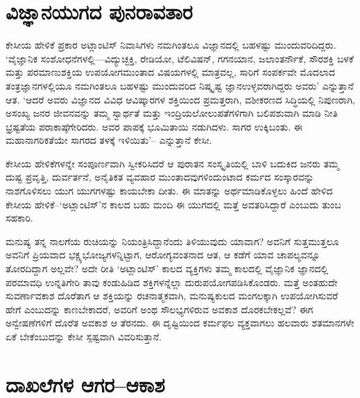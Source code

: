 \section*{ವಿಜ್ಞಾನಯುಗದ ಪುನರಾವತಾರ}


ಕೇಸೀಯ ಹೇಳಿಕೆ ಪ್ರಕಾರ ಅಟ್ಲಾಂಟಿಸ್ ನಿವಾಸಿಗಳು ನಮಗಿಂತಲೂ ವಿಜ್ಞಾನದಲ್ಲಿ ಬಹಳಷ್ಟು ಮುಂದುವರಿದಿದ್ದರು. ‘ವೈಜ್ಞಾನಿಕ ಸಂಶೋಧನೆಗಳಲ್ಲಿ—ವಿದ್ಯುಚ್ಛಕ್ತಿ, ರೇಡಿಯೋ, ಟೆಲಿವಿಷನ್, ಗಗನಯಾನ, ಜಲಾಂತರ್ನೌಕೆ, ಸೌರಶಕ್ತಿ ಬಳಕೆ ಮತ್ತು ಪರಮಾಣುಶಕ್ತಿಯ ಉಪಯೋಗ\break ಮುಂತಾದ ವಿಷಯಗಳಲ್ಲಿ ಮಾತ್ರವಲ್ಲ, ಸಾರಿಗೆ ಸಂಪರ್ಕವೇ ಮೊದಲಾದ ತಂತ್ರಜ್ಞಾನಗಳಲ್ಲಿಯೂ ನಮಗಿಂತಲೂ ಬಹಳಷ್ಟು ಮುಂದುವರಿದ ನಿಷ್ಕೃಷ್ಟ ಜ್ಞಾನಉಳ್ಳವರಾಗಿದ್ದರು ಅವರು’ ಎನ್ನುತ್ತಾನೆ ಆತ. ‘ಆದರೆ ಅವರು ವಿಜ್ಞಾನದ ವಿವಿಧ ಆವಿಷ್ಕಾರಗಳ ಶಕ್ತಿಯಿಂದ ಪ್ರಮತ್ತರಾಗಿ, ವಶೀಕರಣದ ಸಿದ್ಧಿಯಲ್ಲಿ ನಿಪುಣರಾಗಿ, ಅಸಂಖ್ಯ ಜನರ ಜೀವನವನ್ನು ತಮ್ಮ ಸ್ವಾರ್ಥತೆ ಮತ್ತು ಇಂದ್ರಿಯಲೋಲುಪತೆಗಳಿಗಾಗಿ ಬಲಿಪಶುವಾಗಿ ಮಾಡಿ ನೀತಿ ಭ್ರಷ್ಟತೆಯ ಪರಾಕಾಷ್ಠೆಗೇರಿದರು. ಅವರ ಪಾಪಕ್ಕೆ ಭೂಮಿತಾಯಿ ನಡುಗಿದಳು. ಸಾಗರ ಉಕ್ಕಿಬಂತು. ಈ ಮಹಾನಾಗರಿಕತೆಯೇ ಸಾಗರದ ತಳಕ್ಕೆ ಇಳಿಯಿತು’– ಎನ್ನುತ್ತಾನೆ ಕೇಸೀ.

ಕೇಸೀಯ ಹೇಳಿಕೆಗಳನ್ನೇ ಸಂಪೂರ್ಣವಾಗಿ ಸ್ವೀಕರಿಸಿದರೆ ಆ ಪುರಾತನ ಸಂಸ್ಕೃತಿಯಲ್ಲಿ ಬಾಳಿ ಬದುಕಿದ ಜನರು ತಮ್ಮ ದುಷ್ಟ ಪ್ರವೃತ್ತಿ, ದುರ್ವರ್ತನೆ, ಅನೈತಿಕತ ವ್ಯವಹಾರ ಮುಂತಾದವು\-ಗಳಿಂದುಂಟಾದ ಕರ್ಮದ ಸಂಸ್ಕಾರವನ್ನು ನಾಶಗೊಳಿಸಲು ಯುಗ ಯುಗಗಳಷ್ಟು ಕಾಯಬೇಕಾ ದೀತು. ಈ ಮಾತನ್ನು ಅರ್ಥಮಾಡಿಕೊಳ್ಳಲು ಹಿಂದೆ ಹೇಳಿದ ಕೇಸೀಯ ಹೇಳಿಕೆ–‘ಅಟ್ಲಾಂಟಿಸ್​’ನ ಕಾಲದ ಬಹು ಮಂದಿ ಈ ಯುಗದಲ್ಲಿ ಮತ್ತೆ ಅವತರಿಸಿದ್ದಾರೆ ಎಂಬುದು ತುಂಬ ಸಹಕಾರಿ.

ಮನುಷ್ಯ ತನ್ನ ನಾಲಗೆಯ ರುಚಿಯನ್ನು ನಿಯಂತ್ರಿಸಿದ್ದಾನೆಂದು ತಿಳಿಯುವುದು ಯಾವಾಗ? ಅವನಿಗೆ ಸುತ್ತಮುತ್ತಲೂ ಅವನಿಗೆ ಪ್ರಿಯವಾದ ಭಕ್ಷ್ಯಭೋಜ್ಯಗಳನ್ನಿಟ್ಟಾಗ, ಆರೋಗ್ಯವಂತನಾದ ಆತ, ಆ ಕಡೆಗೆ ಯಾವ ಚಾಪಲ್ಯವನ್ನೂ ತೋರದಿದ್ದಾಗ ಅಲ್ಲವೇ? ಅದೇ ರೀತಿ ‘ಅಟ್ಲಾಂಟಿಸ್​​’ ಕಾಲದ ವ್ಯಕ್ತಿಗಳು ತಮ್ಮ ಕಾಲದಲ್ಲಿ ವೈಜ್ಞಾನಿಕ ಜ್ಞಾನದಲ್ಲಿ ಪರಮಾವಧಿ ಉನ್ನತಿಗೇರಿ ತಾವು ಕಂಡುಹಿಡಿದ ಶಕ್ತಿಗಳನ್ನೆಲ್ಲಾ ದುರುಪಯೋಗಪಡಿಸಿಕೊಂಡರು. ಮತ್ತೆ ಅಂತಹುದೇ ಸುವರ್ಣಾವ\-ಕಾಶ ದೊರೆತಾಗ ಆ ಶಕ್ತಿಯನ್ನು ರಚನಾತ್ಮಕವಾಗಿ, ಮನುಷ್ಯಕುಲದ ಮಂಗಲಕ್ಕಾಗಿ ಉಪಯೋಗಿಸು\-ವರೆ ಹೇಗೆ ಎಂಬುದನ್ನು ಕಾಣಬೇಕಾದರೆ, ಅವರಿಗೆ ಅಂಥ ಸೌಲಭ್ಯಗಳಿರುವ ಅವಕಾಶ ದೊರಕ\-ಬೇಕಲ್ಲವೆ? ಈಗ ಅನ್ವೇಷಣೆಗಳಿಗೆ ದೊರೆತ ಅವಕಾಶ ಆ ತೆರನದು. ಈ ದೃಷ್ಟಿಯಿಂದ ಕರ್ಮಫಲ ವ್ಯಕ್ತವಾಗಲು ಹಲವಾರು ಶತಮಾನಗಳೇ ಏಕೆ ಬೇಕೆಂಬುದನ್ನು ಕೇಸೀ ಸ್ಪಷ್ಟವಾಗಿ ವಿವರಿಸುತ್ತಾನೆ.


\section*{ದಾಖಲೆಗಳ ಆಗರ–ಆಕಾಶ}


